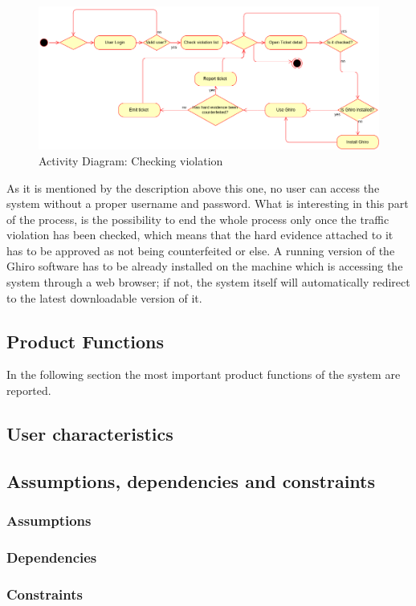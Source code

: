 \documentclass{article}
\begin{document}
\begin{figure}[H]
    \centering
    \includegraphics[scale=0.36]{Images/ActivityCheckViolation}
    \caption{Activity Diagram: Checking violation}
\end{figure}

As it is mentioned by the description above this one, no user can access the system
without a proper username and password. What is interesting in this part of the
process, is the possibility to end the whole process only once the traffic
violation has been checked, which means that the hard evidence attached to it
has to be approved as not being counterfeited or else. A running version of the
Ghiro software has to be already installed on the machine which is accessing the
system through a web browser; if not, the system itself will automatically
redirect to the latest downloadable version of it. 


\subsection{Product Functions}
In the following section the most important product functions of the system are
reported.
\subsection{User characteristics}
\subsection{Assumptions, dependencies and constraints}
\subsubsection{Assumptions}
\subsubsection{Dependencies}
\subsubsection{Constraints}
\end{document}
